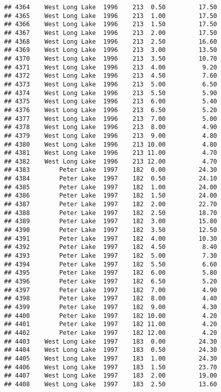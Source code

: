\documentclass[
]{article}
\begin{document}
\begin{verbatim}
## 4364    West Long Lake  1996    213  0.50         17.50
## 4365    West Long Lake  1996    213  1.00         17.50
## 4366    West Long Lake  1996    213  1.50         17.50
## 4367    West Long Lake  1996    213  2.00         17.50
## 4368    West Long Lake  1996    213  2.50         16.60
## 4369    West Long Lake  1996    213  3.00         13.50
## 4370    West Long Lake  1996    213  3.50         10.70
## 4371    West Long Lake  1996    213  4.00          9.20
## 4372    West Long Lake  1996    213  4.50          7.60
## 4373    West Long Lake  1996    213  5.00          6.50
## 4374    West Long Lake  1996    213  5.50          5.90
## 4375    West Long Lake  1996    213  6.00          5.40
## 4376    West Long Lake  1996    213  6.50          5.20
## 4377    West Long Lake  1996    213  7.00          5.00
## 4378    West Long Lake  1996    213  8.00          4.90
## 4379    West Long Lake  1996    213  9.00          4.80
## 4380    West Long Lake  1996    213 10.00          4.80
## 4381    West Long Lake  1996    213 11.00          4.70
## 4382    West Long Lake  1996    213 12.00          4.70
## 4383        Peter Lake  1997    182  0.00         24.30
## 4384        Peter Lake  1997    182  0.50         24.10
## 4385        Peter Lake  1997    182  1.00         24.00
## 4386        Peter Lake  1997    182  1.50         24.00
## 4387        Peter Lake  1997    182  2.00         22.70
## 4388        Peter Lake  1997    182  2.50         18.70
## 4389        Peter Lake  1997    182  3.00         15.80
## 4390        Peter Lake  1997    182  3.50         12.50
## 4391        Peter Lake  1997    182  4.00         10.30
## 4392        Peter Lake  1997    182  4.50          8.40
## 4393        Peter Lake  1997    182  5.00          7.30
## 4394        Peter Lake  1997    182  5.50          6.60
## 4395        Peter Lake  1997    182  6.00          5.80
## 4396        Peter Lake  1997    182  6.50          5.20
## 4397        Peter Lake  1997    182  7.00          4.90
## 4398        Peter Lake  1997    182  8.00          4.40
## 4399        Peter Lake  1997    182  9.00          4.30
## 4400        Peter Lake  1997    182 10.00          4.20
## 4401        Peter Lake  1997    182 11.00          4.20
## 4402        Peter Lake  1997    182 12.00          4.20
## 4403    West Long Lake  1997    183  0.00         24.30
## 4404    West Long Lake  1997    183  0.50         24.30
## 4405    West Long Lake  1997    183  1.00         24.30
## 4406    West Long Lake  1997    183  1.50         23.70
## 4407    West Long Lake  1997    183  2.00         19.00
## 4408    West Long Lake  1997    183  2.50         13.60

\end{verbatim}
\end{document}
